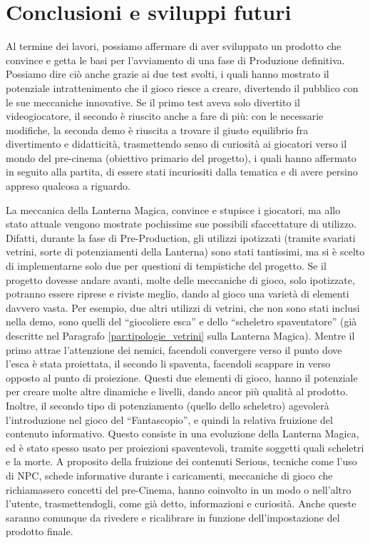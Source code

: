 \chapter{Conclusioni e sviluppi futuri}
\label{chap:risultati}

Al termine dei lavori, possiamo affermare di aver sviluppato un prodotto che convince e getta le basi per l'avviamento di una fase di Produzione definitiva. Possiamo dire ciò anche grazie ai due test svolti, i quali hanno mostrato il potenziale intrattenimento che il gioco riesce a creare, divertendo il pubblico con le sue meccaniche innovative. Se il primo test aveva solo divertito il videogiocatore, il secondo è riuscito anche a fare di più: con le necessarie modifiche, la seconda demo è riuscita a trovare il giusto equilibrio fra divertimento e didatticità, trasmettendo senso di curiosità ai giocatori verso il mondo del pre-cinema (obiettivo primario del progetto), i quali hanno affermato in seguito alla partita, di essere stati incuriositi dalla tematica e di avere persino appreso qualcosa a riguardo.

La meccanica della Lanterna Magica, convince e stupisce i giocatori, ma allo stato attuale vengono mostrate pochissime sue possibili sfaccettature di utilizzo. Difatti, durante la fase di Pre-Production, gli utilizzi ipotizzati (tramite svariati vetrini, sorte di potenziamenti della Lanterna) sono stati tantissimi, ma si è scelto di implementarne solo due per questioni di tempistiche del progetto. Se il progetto dovesse andare avanti, molte delle meccaniche di gioco, solo ipotizzate, potranno essere riprese e riviste meglio, dando al gioco una varietà di elementi davvero vasta. Per esempio, due altri utilizzi di vetrini, che non sono stati inclusi nella demo, sono quelli del ``giocoliere esca'' e dello ``scheletro spaventatore'' (già descritte nel Paragrafo \ref{par:tipologie_vetrini} sulla Lanterna Magica). Mentre il primo attrae l'attenzione dei nemici, facendoli convergere verso il punto dove l'esca è stata proiettata, il secondo li spaventa, facendoli scappare in verso opposto al punto di proiezione. Questi due elementi di gioco, hanno il potenziale per creare molte altre dinamiche e livelli, dando ancor più qualità al prodotto. Inoltre, il secondo tipo di potenziamento (quello dello scheletro) agevolerà l'introduzione nel gioco del ``Fantascopio'', e quindi la relativa fruizione del contenuto informativo. Questo consiste in una evoluzione della Lanterna Magica, ed è stato spesso usato per proiezioni spaventevoli, tramite soggetti quali scheletri e la morte.
A proposito della fruizione dei contenuti Serious, tecniche come l'uso di NPC, schede informative durante i caricamenti, meccaniche di gioco che richiamassero concetti del pre-Cinema, hanno coinvolto in un modo o nell'altro l'utente, trasmettendogli, come già detto, informazioni e curiosità. Anche queste saranno comunque da rivedere e ricalibrare in funzione dell'impostazione del prodotto finale.

